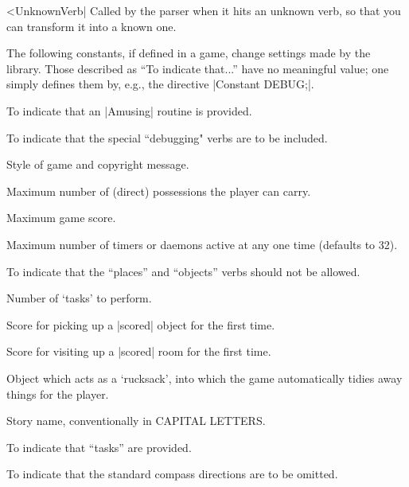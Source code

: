 ^^|UnknownVerb|
Called by the parser when it hits an unknown verb,
so that you can transform it into a known one.

\bigskip\noindent
The following constants, if defined in a game, change settings made by the
library.  Those described as ``To indicate that...'' have no meaningful
value; one simply defines them by, e.g., the directive |Constant DEBUG;|.

\bigskip\stepin=90pt

To indicate that an |Amusing| routine is provided.

To indicate that the special ``debugging" verbs are to be
included.

Style of game and copyright message.

Maximum number of (direct) possessions the player can
carry.

Maximum game score.

Maximum number of timers or daemons active at any one time
(defaults to 32).

To indicate that the ``places'' and ``objects'' verbs
should not be allowed.

Number of `tasks' to perform.

Score for picking up a |scored| object for the first
time.

Score for visiting up a |scored| room for the first time.

Object which acts as a `rucksack', into which the game
automatically tidies away things for the player.

Story name, conventionally in CAPITAL LETTERS.

To indicate that ``tasks'' are provided.

To indicate that the standard compass directions
are to be omitted.

